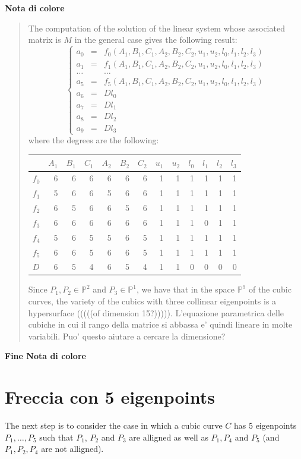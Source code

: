 \documentclass{amsart}
\theoremstyle{plain}
\theoremstyle{definition}
\begin{document}
\noindent
\textbf{Nota di colore}
\begin{quote}
The computation of the solution of the linear system whose associated
matrix is $M$ in the general case gives the following
result:
\[
\left\{
\begin{array}{rcl}
  a_0 & = & f_0(A_1, B_1, C_1, A_2, B_2, C_2, u_1, u_2, l_0, l_1, l_2, l_3) \\
  a_1 & = & f_1(A_1, B_1, C_1, A_2, B_2, C_2, u_1, u_2, l_0, l_1, l_2, l_3) \\
  \dots & & \dots \\
  a_5 & = & f_5(A_1, B_1, C_1, A_2, B_2, C_2, u_1, u_2, l_0, l_1, l_2, l_3) \\
  a_6 & = & D l_0\\
  a_7 & = & D l_1\\
  a_8 & = & D l_2\\
  a_9 &=& D l_3
\end{array}
\right.
\]
where the degrees are the following:

\begin{tabular}{|l|rrrrrrrrrrrr|} \hline
  & $A_{1}$ & $B_{1}$ & $C_{1}$ & $A_{2}$ & $B_{2}$ & $C_{2}$ &
  $u_{1}$ & $u_{2}$ & $l_0$ & $l_1$ & $l_2$ & $l_3$ \\ \hline
$f_0$& 6 & 6 & 6 & 6 & 6 & 6 & 1 & 1 & 1 & 1 & 1 & 1 \\
$f_1$& 5 & 6 & 6 & 5 & 6 & 6 & 1 & 1 & 1 & 1 & 1 & 1 \\
$f_2$& 6 & 5 & 6 & 6 & 5 & 6 & 1 & 1 & 1 & 1 & 1 & 1 \\
$f_3$& 6 & 6 & 6 & 6 & 6 & 6 & 1 & 1 & 1 & 0 & 1 & 1 \\
$f_4$& 5 & 6 & 5 & 5 & 6 & 5 & 1 & 1 & 1 & 1 & 1 & 1 \\
$f_5$& 6 & 6 & 5 & 6 & 6 & 5 & 1 & 1 & 1 & 1 & 1 & 1 \\
$D$& 6 & 5 & 4 & 6 & 5 & 4 & 1 & 1 & 0 & 0 & 0 & 0 \\ \hline
\end{tabular}

Since $P_1, P_2 \in \mathbb{P}^2$ and $P_3 \in
\mathbb{P}^1$, we have that in the space $\mathbb{P}^9$ of the cubic
curves, the variety of the cubics with three collinear eigenpoints is
a hypersurface (((((of dimension 15?))))).
L'equazione parametrica delle cubiche in cui il rango della matrice si
abbassa e' quindi lineare in molte variabili. Puo' questo aiutare a cercare
la dimensione?
\end{quote}
\textbf{Fine Nota di colore}

\section{Freccia con 5 eigenpoints} 
The next step is to consider the case in which a cubic curve $C$
has $5$ eigenpoints $P_1, \dots, P_5$ such that
$P_1$, $P_2$ and $P_3$ are alligned as well as
$P_1, P_4$ and $P_5$ (and $P_1, P_2, P_4$ are not alligned). 
\end{document}
